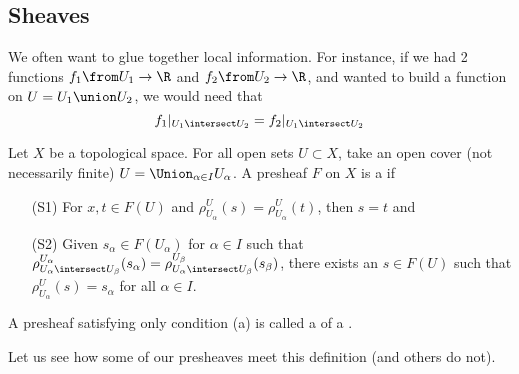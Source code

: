 \documentclass[11pt,leqno,oneside]{amsbook}
\renewcommand{\F}{F}
\numberwithin{thm}{section}
\begin{document}
\subsection{Sheaves}
We often want to glue together local information. For instance, if we
had 2 functions \(f_1 \from U_1 \to \R\) and \(f_2 \from U_2 \to \R\),
and wanted to build a function on \(U = U_1 \union U_2\), we would
need that \[
  f_1|_{U_1 \intersect U_2} = f_2|_{U_1 \intersect U_2}
\]
\begin{defn}
  Let \(X\) be a topological space. For all open sets \(U \subset X\),
  take an open cover (not necessarily finite)  \(U = \Union_{\alpha
    \in I} U_\alpha\). A presheaf \(\F\) on \(X\) is a  if
  \begin{enumerate}
  \item[(S1)] For \(x,t \in \F(U)\) and \(\rho^U_{U_\alpha}(s) =
    \rho^U_{U_\alpha}(t)\), then \(s=t\) and
  \item[(S2)] Given \(s_\alpha \in \F(U_\alpha)\) for \(\alpha \in I\) such that
    \(\rho^{U_\alpha}_{U_\alpha \intersect U_\beta}(s_\alpha) =
    \rho^{U_\beta}_{U_\alpha \intersect U_\beta}(s_\beta) \), there
    exists an \(s \in \F(U)\) such that \(\rho^U_{U_\alpha}(s) =
    s_\alpha \) for all \(\alpha \in I\).
  \end{enumerate}
\end{defn}
\begin{rmk}
  A presheaf satisfying only condition (a) is called a  of a .
\end{rmk}
Let us see how some of our presheaves meet this definition (and others
do not).
\end{document}
